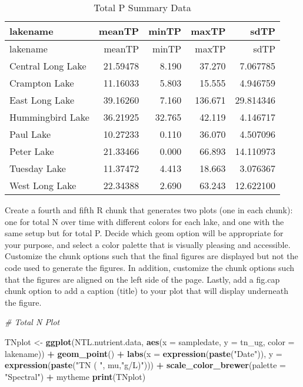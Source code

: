 \documentclass[]{article}
\newenvironment{Shaded}{\begin{snugshade}}{\end{snugshade}}
\newcommand{\KeywordTok}[1]{\textcolor[rgb]{0.13,0.29,0.53}{\textbf{#1}}}
\newcommand{\DataTypeTok}[1]{\textcolor[rgb]{0.13,0.29,0.53}{#1}}
\newcommand{\StringTok}[1]{\textcolor[rgb]{0.31,0.60,0.02}{#1}}
\newcommand{\CommentTok}[1]{\textcolor[rgb]{0.56,0.35,0.01}{\textit{#1}}}
\newcommand{\OperatorTok}[1]{\textcolor[rgb]{0.81,0.36,0.00}{\textbf{#1}}}
\newcommand{\NormalTok}[1]{#1}
\begin{document}
\begin{longtable}[]{@{}lrrrr@{}}
\caption{Total P Summary Data}\tabularnewline
\toprule
lakename & meanTP & minTP & maxTP & sdTP\tabularnewline
\midrule
\endfirsthead
\toprule
lakename & meanTP & minTP & maxTP & sdTP\tabularnewline
\midrule
\endhead
Central Long Lake & 21.59478 & 8.190 & 37.270 & 7.067785\tabularnewline
Crampton Lake & 11.16033 & 5.803 & 15.555 & 4.946759\tabularnewline
East Long Lake & 39.16260 & 7.160 & 136.671 & 29.814346\tabularnewline
Hummingbird Lake & 36.21925 & 32.765 & 42.119 & 4.146717\tabularnewline
Paul Lake & 10.27233 & 0.110 & 36.070 & 4.507096\tabularnewline
Peter Lake & 21.33466 & 0.000 & 66.893 & 14.110973\tabularnewline
Tuesday Lake & 11.37472 & 4.413 & 18.663 & 3.076367\tabularnewline
West Long Lake & 22.34388 & 2.690 & 63.243 & 12.622100\tabularnewline
\bottomrule
\end{longtable}

Create a fourth and fifth R chunk that generates two plots (one in each
chunk): one for total N over time with different colors for each lake,
and one with the same setup but for total P. Decide which geom option
will be appropriate for your purpose, and select a color palette that is
visually pleasing and accessible. Customize the chunk options such that
the final figures are displayed but not the code used to generate the
figures. In addition, customize the chunk options such that the figures
are aligned on the left side of the page. Lastly, add a fig.cap chunk
option to add a caption (title) to your plot that will display
underneath the figure.

\begin{Shaded}
\begin{Highlighting}[]
\CommentTok{# Total N Plot}

\NormalTok{TNplot <-}\StringTok{ }
\StringTok{  }\KeywordTok{ggplot}\NormalTok{(NTL.nutrient.data, }\KeywordTok{aes}\NormalTok{(}\DataTypeTok{x =}\NormalTok{ sampledate, }\DataTypeTok{y =}\NormalTok{ tn_ug, }
                     \DataTypeTok{color =}\NormalTok{ lakename)) }\OperatorTok{+}
\StringTok{  }\KeywordTok{geom_point}\NormalTok{() }\OperatorTok{+}
\StringTok{  }\KeywordTok{labs}\NormalTok{(}\DataTypeTok{x =} \KeywordTok{expression}\NormalTok{(}\KeywordTok{paste}\NormalTok{(}\StringTok{"Date"}\NormalTok{)),}
    \DataTypeTok{y =} \KeywordTok{expression}\NormalTok{(}\KeywordTok{paste}\NormalTok{(}\StringTok{"TN ( "}\NormalTok{, mu,}\StringTok{"g/L)"}\NormalTok{))) }\OperatorTok{+}
\StringTok{  }\KeywordTok{scale_color_brewer}\NormalTok{(}\DataTypeTok{palette =} \StringTok{"Spectral"}\NormalTok{) }\OperatorTok{+}
\StringTok{  }\NormalTok{mytheme}
\KeywordTok{print}\NormalTok{(TNplot)}
\end{Highlighting}
\end{Shaded}
\end{document}
